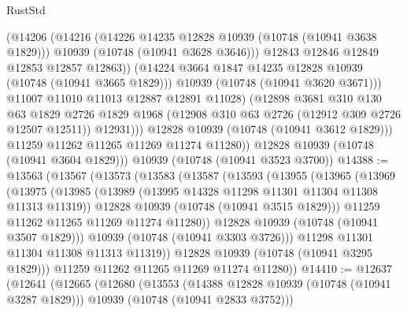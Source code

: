 \begin{lexlean}{RustStd}
\begin{coremodule}
{\begin{coremodule}
{{{{{                      (@14206
                        (@14216
                          (@14226 @14235 @12828 @10939 (@10748 (@10941 @3638 @1829)))
                          @10939
                          (@10748 (@10941 @3628 @3646)))
                        @12843
                        @12846
                        @12849
                        @12853
                        @12857
                        @12863))
                    (@14224 @3664 @1847 @14235 @12828 @10939 (@10748 (@10941 @3665 @1829)))
                    @10939
                    (@10748 (@10941 @3620 @3671)))
                  @11007
                  @11010
                  @11013
                  @12887
                  @12891
                  @11028)
                (@12898
                  @3681
                  @310
                  @130
                  @63
                  @1829
                  @2726
                  @1829
                  @1968
                  (@12908 @310 @63 @2726 (@12912 @309 @2726 @12507 @12511))
                  @12931)))
            @12828
            @10939
            (@10748 (@10941 @3612 @1829)))
          @11259
          @11262
          @11265
          @11269
          @11274
          @11280))
      @12828
      @10939
      (@10748 (@10941 @3604 @1829)))
    @10939
    (@10748 (@10941 @3523 @3700))
@14388 := @13563
    (@13567
      (@13573
        (@13583
          (@13587
            (@13593
              (@13955
                (@13965
                  (@13969
                    (@13975
                      (@13985
                        (@13989 (@13995 @14328 @11298 @11301 @11304 @11308 @11313 @11319))
                        @12828
                        @10939
                        (@10748 (@10941 @3515 @1829)))
                      @11259
                      @11262
                      @11265
                      @11269
                      @11274
                      @11280))
                  @12828
                  @10939
                  (@10748 (@10941 @3507 @1829)))
                @10939
                (@10748 (@10941 @3303 @3726)))
              @11298
              @11301
              @11304
              @11308
              @11313
              @11319))
          @12828
          @10939
          (@10748 (@10941 @3295 @1829)))
        @11259
        @11262
        @11265
        @11269
        @11274
        @11280))
@14410 := @12637
    (@12641
      (@12665
        (@12680
          (@13553
            (@14388 @12828 @10939 (@10748 (@10941 @3287 @1829)))
            @10939
            (@10748 (@10941 @2833 @3752)))
}}}}}
\end{coremodule}}
\end{coremodule}
\end{lexlean}

